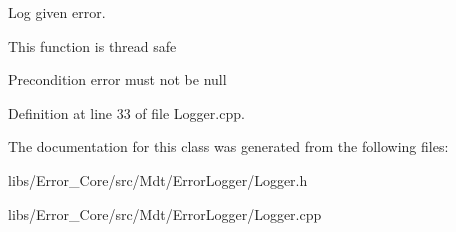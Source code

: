 Log given error. 

This function is thread safe \begin{DoxyPrecond}{Precondition}
error must not be null 
\end{DoxyPrecond}


Definition at line 33 of file Logger.\+cpp.



The documentation for this class was generated from the following files\+:\begin{DoxyCompactItemize}
\item 
libs/\+Error\+\_\+\+Core/src/\+Mdt/\+Error\+Logger/Logger.\+h\item 
libs/\+Error\+\_\+\+Core/src/\+Mdt/\+Error\+Logger/Logger.\+cpp\end{DoxyCompactItemize}
